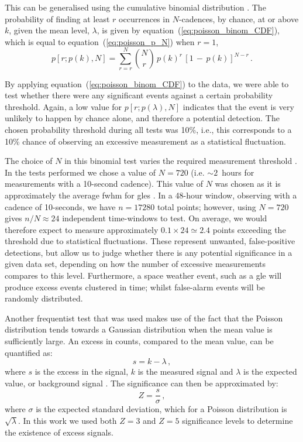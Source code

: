 This can be generalised using the cumulative binomial distribution \citep{basu_asteroseismic_2017}. The probability of finding at least $r$ occurrences in $N$-cadences, by chance, at or above $k$, given the mean level, $\lambda$, is given by equation~(\ref{eq:poisson_binom_CDF}), which is equal to equation~(\ref{eq:poisson_p_N}) when $r=1$,
%
\begin{equation}
p[r; p(k), N] = \sum_{r=r}^{N} \binom{N}{r} \, p(k)^r \, [1 \, - \, p(k)]^{N-r} \, .
\label{eq:poisson_binom_CDF}
\end{equation}

By applying equation~(\ref{eq:poisson_binom_CDF}) to the data, we were able to test whether there were any significant events against a certain probability threshold. Again, a low value for $p[r; p(\lambda), N]$ indicates that the event is very unlikely to happen by chance alone, and therefore a potential detection. The chosen probability threshold during all tests was 10\%, i.e., this corresponds to a 10\% chance of observing an excessive measurement as a statistical fluctuation.

The choice of $N$ in this binomial test varies the required measurement threshold \citep{basu_asteroseismic_2017}. In the tests performed we chose a value of $N=720$ (i.e. $\sim2$~hours for measurements with a 10-second cadence). This value of $N$ was chosen as it is approximately the average \gls{fwhm} for \glspl{gle} \citep{strauss_pulse_2017}. In a 48-hour window, observing with a cadence of 10-seconds, we have $n=17280$ total points; however, using $N=720$ gives $n/N\approx24$ independent time-windows to test. On average, we would therefore expect to measure approximately $0.1 \times 24 \simeq 2.4$ points exceeding the threshold due to statistical fluctuations. These represent unwanted, false-positive detections, but allow us to judge whether there is any potential significance in a given data set, depending on how the number of excessive measurements compares to this level. Furthermore, a space weather event, such as a \gls{gle} will produce excess events clustered in time; whilst false-alarm events will be randomly distributed.


Another frequentist test that was used makes use of the fact that the Poisson distribution tends towards a Gaussian distribution when the mean value is sufficiently large. An excess in counts, compared to the mean value, can be quantified as:
%
\begin{equation}
s = k - \lambda \, ,
\label{eq:poisson_excess}
\end{equation}
%
where $s$ is the excess in the signal, $k$ is the measured signal and $\lambda$ is the expected value, or background signal \citep{lista_statistical_2016}. The significance can then be approximated by:
%
\begin{equation}
Z = \frac{s}{\sigma} \, ,
\label{eq:poisson_significance}
\end{equation}
%
where $\sigma$ is the expected standard deviation, which for a Poisson distribution is $\sqrt{\lambda}$. In this work we used both $Z = 3$ and $Z = 5$ significance levels to determine the existence of excess signals.

